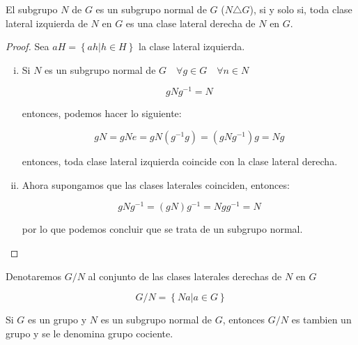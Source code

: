 	\begin{lema}
		El subgrupo $N$ de $G$ es un subgrupo normal de $G$ ($N \triangle G$), si y solo si, toda clase lateral izquierda de $N$ en $G$ es una clase lateral derecha de $N$ en $G$.
	\end{lema}

	\begin{proof}
		Sea $aH = \left\{ ah | h \in H \right\}$ la clase lateral izquierda.
		\begin{enumerate}[i)]
			\item Si $N$ es un subgrupo normal de $G \quad \forall g \in G \quad \forall n \in N$

			\begin{equation}
				g N g^{-1} = N \nonumber
			\end{equation}

			entonces, podemos hacer lo siguiente:

			\begin{equation}
				g N = g N e = g N \left( g^{-1} g \right) = \left( g N g^{-1} \right) g = N g \nonumber
			\end{equation}

			entonces, toda clase lateral izquierda coincide con la clase lateral derecha.

			\item Ahora supongamos que las clases laterales coinciden, entonces:

			\begin{equation}
				g N g^{-1} = \left( g N \right) g^{-1} = N g g^{-1} = N \nonumber
			\end{equation}

			por lo que podemos concluir que se trata de un subgrupo normal.
		\end{enumerate}
	\end{proof}

	\begin{definicion}
		Denotaremos $G/N$ al conjunto de las clases laterales derechas de $N$ en $G$

		\begin{equation}
			G/N = \left\{ Na | a \in G \right\}
		\end{equation}
	\end{definicion}

	\begin{teorema}
		Si $G$ es un grupo y $N$ es un subgrupo normal de $G$, entonces $G/N$ es tambien un grupo y se le denomina grupo cociente.
	\end{teorema}

